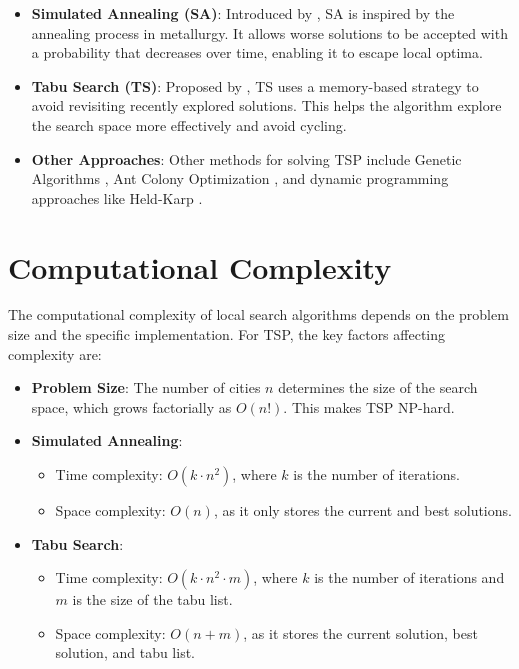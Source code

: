 \documentclass{article}
\begin{document}
\begin{itemize}
    \item \textbf{Simulated Annealing (SA)}: Introduced by \cite{kirkpatrick1983optimization}, SA is inspired by the annealing process in metallurgy. It allows worse solutions to be accepted with a probability that decreases over time, enabling it to escape local optima.
    \item \textbf{Tabu Search (TS)}: Proposed by \cite{glover1986future}, TS uses a memory-based strategy to avoid revisiting recently explored solutions. This helps the algorithm explore the search space more effectively and avoid cycling.
    \item \textbf{Other Approaches}: Other methods for solving TSP include Genetic Algorithms \cite{goldberg1989genetic}, Ant Colony Optimization \cite{dorigo1996ant}, and dynamic programming approaches like Held-Karp \cite{held1962dynamic}.
\end{itemize}

\section{Computational Complexity}
The computational complexity of local search algorithms depends on the problem size and the specific implementation. For TSP, the key factors affecting complexity are:

\begin{itemize}
    \item \textbf{Problem Size}: The number of cities \( n \) determines the size of the search space, which grows factorially as \( O(n!) \). This makes TSP NP-hard.
    \item \textbf{Simulated Annealing}:
        \begin{itemize}
            \item Time complexity: \( O(k \cdot n^2) \), where \( k \) is the number of iterations.
            \item Space complexity: \( O(n) \), as it only stores the current and best solutions.
        \end{itemize}
    \item \textbf{Tabu Search}:
        \begin{itemize}
            \item Time complexity: \( O(k \cdot n^2 \cdot m) \), where \( k \) is the number of iterations and \( m \) is the size of the tabu list.
            \item Space complexity: \( O(n + m) \), as it stores the current solution, best solution, and tabu list.
        \end{itemize}
\end{itemize}
\end{document}

